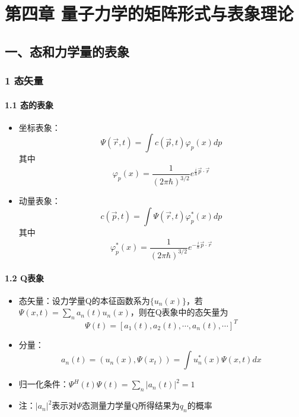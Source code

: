 \documentclass[UTF8,twocolumn]{ctexart}
\date{}
\providecommand{\tightlist}{%
  \setlength{\itemsep}{0pt}\setlength{\parskip}{0pt}}
\let\oldparagraph\paragraph
\renewcommand{\paragraph}[1]{\oldparagraph{#1}\mbox{}}
\begin{document}
\hypertarget{ux7b2cux4e09ux7ae0-ux91cfux5b50ux529bux5b66ux7684ux77e9ux9635ux5f62ux5f0fux4e0eux8868ux8c61ux7406ux8bba}{%
\section{第四章{ }量子力学的矩阵形式与表象理论}\label{ux7b2cux4e09ux7ae0-ux91cfux5b50ux529bux5b66ux7684ux77e9ux9635ux5f62ux5f0fux4e0eux8868ux8c61ux7406ux8bba}}

\hypertarget{ux4e00ux6001ux548cux529bux5b66ux91cfux7684ux8868ux8c61}{%
\subsection{一、态和力学量的表象}\label{ux4e00ux6001ux548cux529bux5b66ux91cfux7684ux8868ux8c61}}

\hypertarget{ux6001ux77e2ux91cf}{%
\subsubsection{1 态矢量}\label{ux6001ux77e2ux91cf}}

\hypertarget{ux6001ux7684ux8868ux8c61}{%
\paragraph{ 1.1 态的表象}\label{ux6001ux7684ux8868ux8c61}}

\begin{itemize}
\tightlist
\item
  坐标表象：
  \[\Psi(\vec{r},t)=\int c(\vec{p},t)\varphi_p(x)dp\]
  其中
  \[\varphi_p(x)=\frac{1}{(2\pi\hbar)^{3/2}}e^{\frac{i}{\hbar}\vec{p}\cdot\vec{r}}\]
\item
  动量表象：
  \[c(\vec{p},t)=\int\Psi(\vec{r},t)\varphi_p^*(x)dp\]
  其中
  \[\varphi_p^*(x)=\frac{1}{(2\pi\hbar)^{3/2}}e^{-\frac{i}{\hbar}\vec{p}\cdot\vec{r}}\]
\end{itemize}

\hypertarget{qux8868ux8c61}{%
\paragraph{ 1.2 Q表象}\label{qux8868ux8c61}}

\begin{itemize}
\tightlist
\item
  态矢量：设力学量Q的本征函数系为\(\{u_n(x)\}\)，若\(\Psi(x,t)=\sum_na_n(t)u_n(x)\)，则在Q表象中的态矢量为
  \[\Psi(t)=[a_1(t),a_2(t),\cdots,a_n(t),\cdots]^T\]
\item
  分量：
  \[a_n(t)=(u_n(x),\Psi(x_t))=\int u_n^*(x)\Psi(x,t)dx\]
\item
  归一化条件：\(\Psi^H(t)\Psi(t)=\sum_n|a_n(t)|^2=1\)
\item
  注：\(|a_n|^2\)表示对\(\Psi\)态测量力学量Q所得结果为\(q_n\)的概率
\end{itemize}
\end{document}
